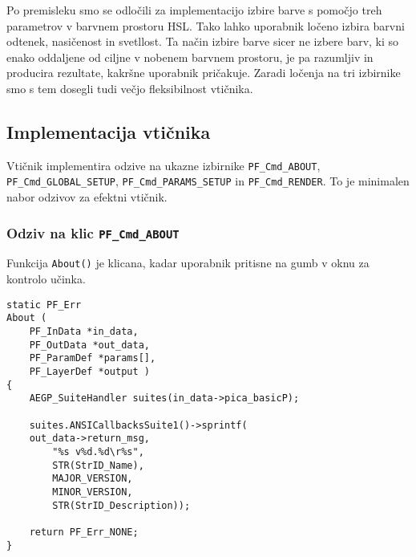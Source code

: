 \documentclass[a4paper, 12pt]{book}
\begin{document}
Po premisleku smo se odločili za implementacijo izbire barve s pomočjo treh parametrov v barvnem prostoru HSL\cite{colordiff1}.
Tako lahko uporabnik ločeno izbira barvni odtenek, nasičenost in svetllost.
Ta način izbire barve sicer ne izbere barv, ki so enako oddaljene od ciljne v nobenem barvnem prostoru, je pa razumljiv in producira rezultate, kakršne uporabnik pričakuje.
Zaradi ločenja na tri izbirnike smo s tem dosegli tudi večjo fleksibilnost vtičnika.


\subsection{Implementacija vtičnika}

Vtičnik implementira odzive na ukazne izbirnike \texttt{PF\_Cmd\_ABOUT}, \texttt{PF\_Cmd\_GLOBAL\_SETUP}, \texttt{PF\_Cmd\_PARAMS\_SETUP} in \texttt{PF\_Cmd\_RENDER}.
To je minimalen nabor odzivov za efektni vtičnik.


\subsubsection{Odziv na klic \texttt{PF\_Cmd\_ABOUT}}
Funkcija \texttt{About()} je klicana, kadar uporabnik pritisne na gumb  v oknu za kontrolo učinka.
\begin{verbatim}
static PF_Err 
About (	
    PF_InData *in_data,
    PF_OutData *out_data,
    PF_ParamDef *params[],
    PF_LayerDef *output )
{
    AEGP_SuiteHandler suites(in_data->pica_basicP);
	
    suites.ANSICallbacksSuite1()->sprintf(
    out_data->return_msg,
        "%s v%d.%d\r%s",
        STR(StrID_Name), 
        MAJOR_VERSION, 
        MINOR_VERSION, 
        STR(StrID_Description));

    return PF_Err_NONE;
}
\end{verbatim}
\end{document}
